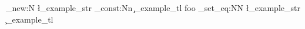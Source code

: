 \str_new:N
  \l_example_str
\tl_const:Nn
  \c_example_tl
  { foo }
\str_set_eq:NN  %
  \l_example_str
  \c_example_tl
